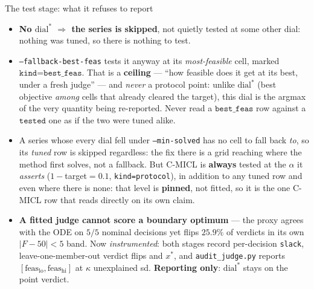 \documentclass{beamer}
\begin{document}
\begin{frame}{The test stage: what it refuses to report}
  \small
  \begin{itemize}
    \item \textbf{No $\text{dial}^\ast$ $\Rightarrow$ the series is skipped},
      not quietly tested at some other dial: nothing was tuned, so there is
      nothing to test.
    \item \texttt{--fallback-best-feas} tests it anyway at its
      \emph{most-feasible} cell, marked $\texttt{kind=best\_feas}$. That is a
      \textbf{ceiling} --- ``how feasible does it get at its best, under a fresh
      judge'' --- and \emph{never} a protocol point: unlike $\text{dial}^\ast$
      (best objective \emph{among} cells that already cleared the target), this
      dial is the argmax of the very quantity being re-reported. Never read a
      $\texttt{best\_feas}$ row against a $\texttt{tested}$ one as if the two
      were tuned alike.
    \item A series whose every dial fell under \texttt{--min-solved} has no cell
      to fall back \emph{to}, so its \emph{tuned} row is skipped regardless: the
      fix there is a grid reaching where the method first solves, not a
      fallback. But C-MICL is
      \textbf{always} tested at the $\alpha$ it \emph{asserts}
      ($1-$target$=0.1$, \texttt{kind=protocol}), in addition to any tuned row
      and even where there is none: that level is \textbf{pinned}, not fitted,
      so it is the one C-MICL row that reads directly on its own claim.
    \item \textbf{A fitted judge cannot score a boundary optimum} --- the proxy
      agrees with the ODE on $5/5$ nominal decisions yet flips $25.9\%$ of
      verdicts in its own $|F-50|<5$ band. Now \emph{instrumented}: both stages
      record per-decision \texttt{slack}, leave-one-member-out verdict flips and
      $x^\ast$, and \texttt{audit\_judge.py} reports
      $[\text{feas}_{\text{lo}},\text{feas}_{\text{hi}}]$ at $\kappa$ unexplained
      sd. \textbf{Reporting only}: $\text{dial}^\ast$ stays on the point verdict.
  \end{itemize}
\end{frame}
\end{document}
